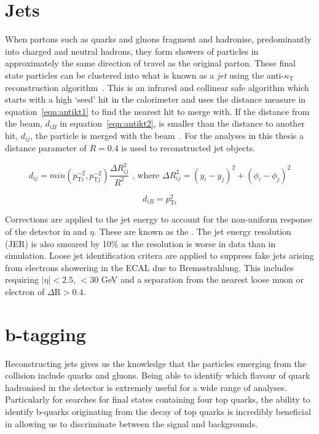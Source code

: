 \section{Jets \label{sec:jetreco}}
When partons such as quarks and gluons fragment and hadronise, predominantly into charged and neutral hadrons, they form showers of particles in approximately the same direction of travel as the original parton. These final state particles can be clustered into what is known as a \emph{jet} using the anti-$\kappa_{\textrm{T}}$ reconstruction algorithm~\cite{Cacciari:2008gp}. This is an infrared and collinear safe algorithm which starts with a high \pt `seed' hit in the calorimeter and uses the distance measure in equation~\ref{eqn:antikt1} to find the nearest hit to merge with. If the distance from the beam, $d_{iB}$ in equation~\ref{eqn:antikt2}, is smaller than the distance to another hit, $d_{ij}$, the particle is merged with the beam~\cite{Salam2010}.  For the analyses in this thesis a distance parameter of $R = 0.4$ is used to reconstructed jet objects. 


\begin{equation}
d_{ij}=min\left( p_{\textrm{T}i}^{-2},p_{\textrm{T}j}^{-2} \right) \frac{\Delta R_{ij}^{2}}{R^{2}} \textrm{ , where } \Delta R_{ij}^{2} = {\left( y_{i} - y_{j}\right)}^{2} +  {\left( {\phi}_{i} - {\phi}_{j}\right)}^{2}
\label{eqn:antikt1}
\end{equation}

\begin{equation}
d_{iB}=p_{\textrm{T}i}^{2}
\label{eqn:antikt2}
\end{equation}

Corrections are applied to the jet energy to account for the non-uniform response of the detector in \pt and $\eta$. These are known as the . The jet energy resolution (JER) is also smeared by 10$\%$ as the resolution is worse in data than in simulation. Loose jet identification critera are applied to suppress fake jets arising from electrons showering in the ECAL due to Bremsstrahlung. This includes requiring $|\eta|<2.5$, \pt$<30$ GeV and a separation from the nearest loose muon or electron of $\Delta\textrm{R}>0.4$.

\section{b-tagging ~\label{sec:btagreco}}
Reconstructing jets gives us the knowledge that the particles emerging from the collision include quarks and gluons. Being able to identify which flavour of quark hadronised in the detector is extremely useful for a wide range of analyses. Particularly for searches for final states containing four top quarks, the ability to identify b-quarks originating from the decay of top quarks is incredibly beneficial in allowing us to discriminate between the signal and backgrounds. 

